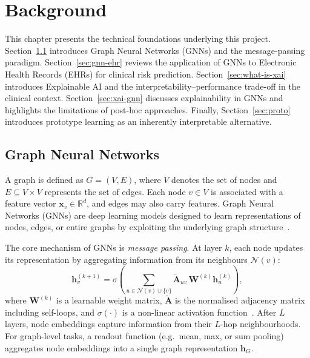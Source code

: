 \chapter{Background}\label{background}

This chapter presents the technical foundations underlying this project.
Section~\ref{sec:gnn} introduces Graph Neural Networks (GNNs) and the
message-passing paradigm. Section~\ref{sec:gnn-ehr} reviews the application of
GNNs to Electronic Health Records (EHRs) for clinical risk prediction.
Section~\ref{sec:what-is-xai} introduces Explainable AI and the
interpretability--performance trade-off in the clinical context.
Section~\ref{sec:xai-gnn} discusses explainability in GNNs and highlights the
limitations of post-hoc approaches. Finally, Section~\ref{sec:proto} introduces
prototype learning as an inherently interpretable alternative.

\section{Graph Neural Networks}
\label{sec:gnn}

A graph is defined as $G = (V, E)$, where $V$ denotes the set of nodes and
$E \subseteq V \times V$ represents the set of edges. Each node $v \in V$ is
associated with a feature vector $\mathbf{x}_v \in \mathbb{R}^d$, and edges may
also carry features. Graph Neural Networks (GNNs) are deep learning models
designed to learn representations of nodes, edges, or entire graphs by
exploiting the underlying graph structure~\cite{yuan2022explainability}.

The core mechanism of GNNs is \emph{message passing}. At layer $k$, each node
updates its representation by aggregating information from its neighbours
$\mathcal{N}(v)$:
%
\begin{equation}
\mathbf{h}_v^{(k+1)} = \sigma\!\left(
  \sum_{u \in \mathcal{N}(v) \cup \{v\}}
  \tilde{\mathbf{A}}_{uv}\, \mathbf{W}^{(k)} \mathbf{h}_u^{(k)}
\right),
\end{equation}
%
where $\mathbf{W}^{(k)}$ is a learnable weight matrix, $\tilde{\mathbf{A}}$ is
the normalised adjacency matrix including self-loops, and $\sigma(\cdot)$ is a
non-linear activation function~\cite{kipf2017gcn}. After $L$ layers, node
embeddings capture information from their $L$-hop neighbourhoods. For
graph-level tasks, a readout function (e.g.\ mean, max, or sum pooling)
aggregates node embeddings into a single graph representation $\mathbf{h}_G$.

